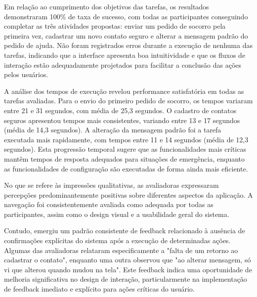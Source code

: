 Em relação ao cumprimento dos objetivos das tarefas, os resultados demonstraram 100\% de taxa de sucesso, com todas as participantes conseguindo completar as três atividades propostas: enviar um pedido de socorro pela primeira vez, cadastrar um novo contato seguro e alterar a mensagem padrão do pedido de ajuda. Não foram registrados erros durante a execução de nenhuma das tarefas, indicando que a interface apresenta boa intuitividade e que os fluxos de interação estão adequadamente projetados para facilitar a conclusão das ações pelos usuários.

A análise dos tempos de execução revelou performance satisfatória em todas as tarefas avaliadas. Para o envio do primeiro pedido de socorro, os tempos variaram entre 21 e 31 segundos, com média de 25,3 segundos. O cadastro de contatos seguros apresentou tempos mais consistentes, variando entre 13 e 17 segundos (média de 14,3 segundos). A alteração da mensagem padrão foi a tarefa executada mais rapidamente, com tempos entre 11 e 14 segundos (média de 12,3 segundos). Esta progressão temporal sugere que as funcionalidades mais críticas mantêm tempos de resposta adequados para situações de emergência, enquanto as funcionalidades de configuração são executadas de forma ainda mais eficiente.

No que se refere às impressões qualitativas, as avaliadoras expressaram percepções predominantemente positivas sobre diferentes aspectos da aplicação. A navegação foi consistentemente avaliada como adequada por todas as participantes, assim como o design visual e a usabilidade geral do sistema.

Contudo, emergiu um padrão consistente de feedback relacionado à ausência de confirmações explícitas do sistema após a execução de determinadas ações. Algumas das avaliadoras relataram especificamente a "falta de um retorno ao cadastrar o contato", enquanto uma outra observou que "ao alterar mensagem, só vi que alterou quando mudou na tela". Este feedback indica uma oportunidade de melhoria significativa no design de interação, particularmente na implementação de feedback imediato e explícito para ações críticas do usuário.

